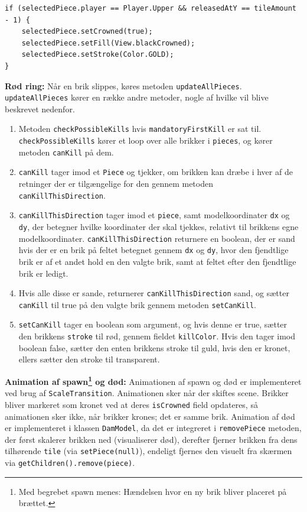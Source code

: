 \begin{lstlisting}
if (selectedPiece.player == Player.Upper && releasedAtY == tileAmount - 1) {
	selectedPiece.setCrowned(true);
	selectedPiece.setFill(View.blackCrowned);
	selectedPiece.setStroke(Color.GOLD);
}
\end{lstlisting}

\textbf{Rød ring:} Når en brik slippes, køres metoden \texttt{updateAllPieces}. \texttt{updateAllPieces} kører en række andre metoder, nogle af hvilke vil blive beskrevet nedenfor.

\begin{enumerate}
    \item Metoden \texttt{checkPossibleKills} hvis \texttt{mandatoryFirstKill} er sat til. \texttt{checkPossibleKills} kører et loop over alle brikker i \texttt{pieces}, og kører metoden \texttt{canKill} på dem.
    
    \item \texttt{canKill} tager imod et \texttt{Piece} og tjekker, om brikken kan dræbe i hver af de retninger der er tilgængelige for den gennem metoden \texttt{canKillThisDirection}.
    
    \item \texttt{canKillThisDirection} tager imod et \texttt{piece}, samt modelkoordinater \texttt{dx} og \texttt{dy}, der betegner hvilke koordinater der skal tjekkes, relativt til brikkens egne modelkoordinater. \texttt{canKillThisDirection} returnere en boolean, der er sand hvis der er en brik på feltet betegnet gennem \texttt{dx} og \texttt{dy}, hvor den fjendtlige brik er af et andet hold en den valgte brik, samt at feltet efter den fjendtlige brik er ledigt. 
    
    \item Hvis alle disse er sande, returnerer \texttt{canKillThisDirection} sand, og sætter \texttt{canKill} til true på den valgte brik gennem metoden \texttt{setCanKill}. 
    
    \item \texttt{setCanKill} tager en boolean som argument, og hvis denne er true, sætter den brikkens \texttt{stroke} til rød, gennem fieldet \texttt{killColor}. Hvis den tager imod boolean false, sætter den enten brikkens stroke til guld, hvis den er kronet, ellers sætter den stroke til transparent.
   
\end{enumerate}

\textbf{Animation af spawn\footnote{Med begrebet spawn menes: Hændelsen hvor en ny brik bliver placeret på brættet.} og død:} Animationen af spawn og død er implementeret ved brug af \texttt{ScaleTransition}. Animationen sker når der skiftes scene. Brikker bliver markeret som kronet ved at deres \texttt{isCrowned} field opdateres, så animationen sker ikke, når brikker krones; det er samme brik. Animation af død er implementeret i klassen \texttt{DamModel}, da det er integreret i \texttt{removePiece} metoden, der først skalerer brikken ned (visualiserer død), derefter fjerner brikken fra dens tilhørende \texttt{tile} (via \texttt{setPiece(null)}), endeligt fjernes den visuelt fra skærmen via \texttt{getChildren().remove(piece)}.

